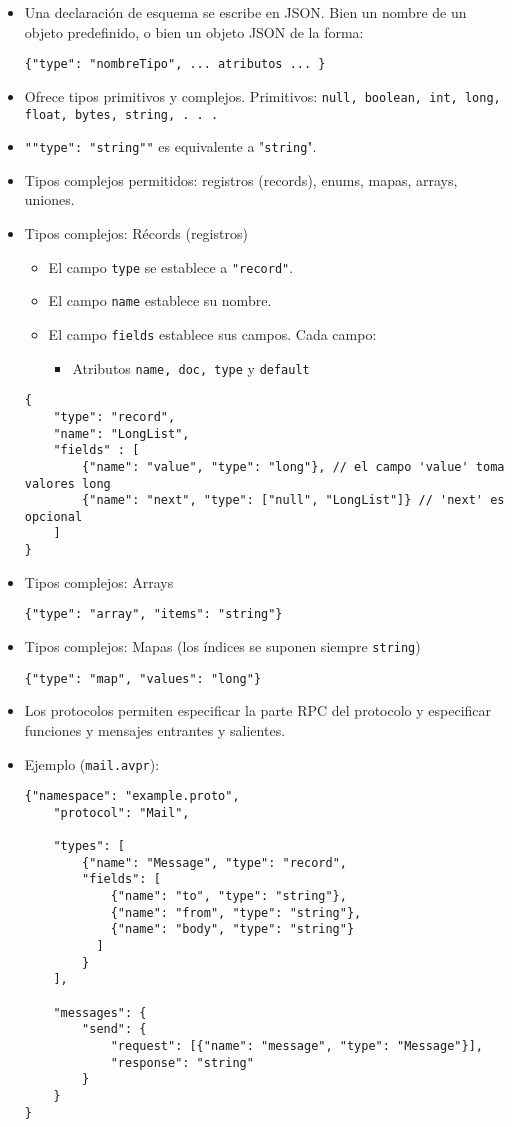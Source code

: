 \begin{itemize}
	\item Una declaración de esquema se escribe en JSON. Bien un nombre de un objeto predefinido, o bien un objeto JSON de la forma:
	\begin{lstlisting}
{"type": "nombreTipo", ... atributos ... }
	\end{lstlisting}
	\item Ofrece tipos primitivos y complejos. Primitivos: \texttt{null, boolean, int, long, float, bytes, string, . . .}
	\item \texttt{"{"type": "string"}"} es equivalente a "\texttt{string}".
	\item Tipos complejos permitidos: registros (records), enums, mapas, arrays, uniones.
	\item Tipos complejos: Récords (registros)
	\begin{itemize}
		\item El campo \texttt{type} se establece a \texttt{"record"}.
		\item El campo \texttt{name} establece su nombre.
		\item El campo \texttt{fields} establece sus campos. Cada campo:
		\begin{itemize}[label=$\to$]
			\item Atributos \texttt{name, doc, type} y \texttt{default}
		\end{itemize}
	\end{itemize}
\begin{lstlisting}
{
	"type": "record",
	"name": "LongList",
	"fields" : [
		{"name": "value", "type": "long"}, // el campo 'value' toma valores long
		{"name": "next", "type": ["null", "LongList"]} // 'next' es opcional
	]
}
\end{lstlisting}

	\item Tipos complejos: Arrays
	\begin{lstlisting}
{"type": "array", "items": "string"}
	\end{lstlisting}
	\item Tipos complejos: Mapas (los índices se suponen siempre \texttt{string})

\begin{lstlisting}
{"type": "map", "values": "long"}
\end{lstlisting}
\item Los protocolos permiten especificar la parte RPC del protocolo y especificar funciones y mensajes entrantes y salientes.
\item Ejemplo (\texttt{mail.avpr}):
\begin{lstlisting}
{"namespace": "example.proto",
	"protocol": "Mail",

	"types": [
		{"name": "Message", "type": "record",
		"fields": [
			{"name": "to", "type": "string"},
			{"name": "from", "type": "string"},
			{"name": "body", "type": "string"}
		  ]
		}
	],

	"messages": {
		"send": {
			"request": [{"name": "message", "type": "Message"}],
			"response": "string"
		}
	}
}
\end{lstlisting}
\end{itemize}
